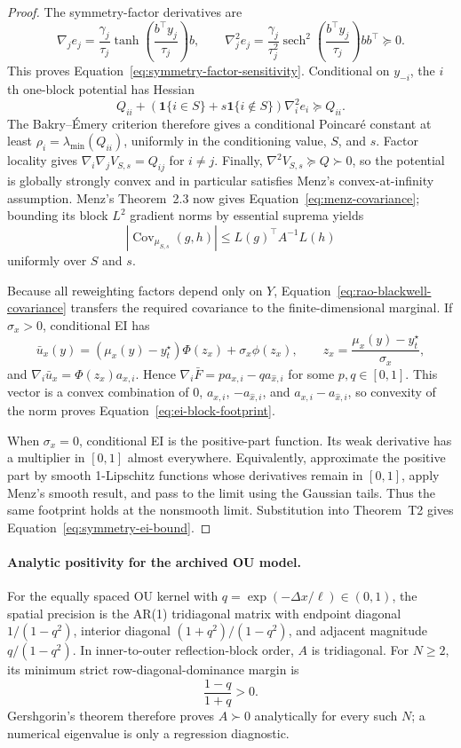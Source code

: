 \begin{proof}
The symmetry-factor derivatives are
\[
 \nabla_j e_j
 =\frac{\gamma_j}{\tau_j}
 \tanh\!\left(\frac{b^\top y_j}{\tau_j}\right)b,
 \qquad
 \nabla_j^2e_j
 =\frac{\gamma_j}{\tau_j^2}
 \operatorname{sech}^2\!\left(\frac{b^\top y_j}{\tau_j}\right)bb^\top
 \succeq0.
\]
This proves Equation~\eqref{eq:symmetry-factor-sensitivity}.  Conditional on
$y_{-i}$, the $i$th one-block potential has Hessian
\[
 Q_{ii}
 +\left(\mathbf 1\{i\in S\}+s\mathbf 1\{i\notin S\}\right)
   \nabla_i^2e_i
 \succeq Q_{ii}.
\]
The Bakry--\'Emery criterion therefore gives a conditional Poincar\'e constant
at least $\rho_i=\lambda_{\min}(Q_{ii})$, uniformly in the conditioning value,
$S$, and $s$.  Factor locality gives
$\nabla_i\nabla_jV_{S,s}=Q_{ij}$ for $i\ne j$.  Finally,
$\nabla^2V_{S,s}\succeq Q\succ0$, so the potential is globally strongly
convex and in particular satisfies Menz's convex-at-infinity assumption.
Menz's Theorem~2.3 now gives Equation~\eqref{eq:menz-covariance}; bounding its
block $L^2$ gradient norms by essential suprema yields
\[
 |\operatorname{Cov}_{\mu_{S,s}}(g,h)|
 \le L(g)^\top A^{-1}L(h)
\]
uniformly over $S$ and $s$.

Because all reweighting factors depend only on $Y$,
Equation~\eqref{eq:rao-blackwell-covariance} transfers the required covariance
to the finite-dimensional marginal.  If $\sigma_x>0$, conditional EI has
\[
 \bar u_x(y)
 = (\mu_x(y)-y_t^\star)\Phi(z_x)+\sigma_x\phi(z_x),
 \qquad
 z_x=\frac{\mu_x(y)-y_t^\star}{\sigma_x},
\]
and $\nabla_i\bar u_x=\Phi(z_x)a_{x,i}$.  Hence
$\nabla_i\bar F=p a_{x,i}-q a_{\widehat x,i}$ for some $p,q\in[0,1]$.
This vector is a convex combination of
$0$, $a_{x,i}$, $-a_{\widehat x,i}$, and
$a_{x,i}-a_{\widehat x,i}$, so convexity of the norm proves
Equation~\eqref{eq:ei-block-footprint}.

When $\sigma_x=0$, conditional EI is the positive-part function.  Its weak
derivative has a multiplier in $[0,1]$ almost everywhere.  Equivalently,
approximate the positive part by smooth 1-Lipschitz functions whose derivatives
remain in $[0,1]$, apply Menz's smooth result, and pass to the limit using the
Gaussian tails.  Thus the same footprint holds at the nonsmooth limit.
Substitution into Theorem~T2 gives Equation~\eqref{eq:symmetry-ei-bound}.
\end{proof}

\paragraph{Analytic positivity for the archived OU model.}
For the equally spaced OU kernel with
$q=\exp(-\Delta x/\ell)\in(0,1)$, the spatial precision is the AR(1)
tridiagonal matrix with endpoint diagonal $1/(1-q^2)$, interior diagonal
$(1+q^2)/(1-q^2)$, and adjacent magnitude $q/(1-q^2)$.  In inner-to-outer
reflection-block order, $A$ is tridiagonal.  For $N\ge2$, its minimum strict
row-diagonal-dominance margin is
\[
 \frac{1-q}{1+q}>0.
\]
Gershgorin's theorem therefore proves $A\succ0$ analytically for every such
$N$; a numerical eigenvalue is only a regression diagnostic.

